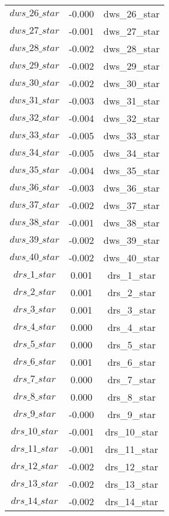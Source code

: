 \begin{center}
\begin{longtable}{ccc}
$dws\_26\_star$ 	 & 	 -0.000 	 & 	 dws\_26\_star\\
$dws\_27\_star$ 	 & 	 -0.001 	 & 	 dws\_27\_star\\
$dws\_28\_star$ 	 & 	 -0.002 	 & 	 dws\_28\_star\\
$dws\_29\_star$ 	 & 	 -0.002 	 & 	 dws\_29\_star\\
$dws\_30\_star$ 	 & 	 -0.002 	 & 	 dws\_30\_star\\
$dws\_31\_star$ 	 & 	 -0.003 	 & 	 dws\_31\_star\\
$dws\_32\_star$ 	 & 	 -0.004 	 & 	 dws\_32\_star\\
$dws\_33\_star$ 	 & 	 -0.005 	 & 	 dws\_33\_star\\
$dws\_34\_star$ 	 & 	 -0.005 	 & 	 dws\_34\_star\\
$dws\_35\_star$ 	 & 	 -0.004 	 & 	 dws\_35\_star\\
$dws\_36\_star$ 	 & 	 -0.003 	 & 	 dws\_36\_star\\
$dws\_37\_star$ 	 & 	 -0.002 	 & 	 dws\_37\_star\\
$dws\_38\_star$ 	 & 	 -0.001 	 & 	 dws\_38\_star\\
$dws\_39\_star$ 	 & 	 -0.002 	 & 	 dws\_39\_star\\
$dws\_40\_star$ 	 & 	 -0.002 	 & 	 dws\_40\_star\\
$drs\_1\_star$ 	 & 	 0.001 	 & 	 drs\_1\_star\\
$drs\_2\_star$ 	 & 	 0.001 	 & 	 drs\_2\_star\\
$drs\_3\_star$ 	 & 	 0.001 	 & 	 drs\_3\_star\\
$drs\_4\_star$ 	 & 	 0.000 	 & 	 drs\_4\_star\\
$drs\_5\_star$ 	 & 	 0.000 	 & 	 drs\_5\_star\\
$drs\_6\_star$ 	 & 	 0.001 	 & 	 drs\_6\_star\\
$drs\_7\_star$ 	 & 	 0.000 	 & 	 drs\_7\_star\\
$drs\_8\_star$ 	 & 	 0.000 	 & 	 drs\_8\_star\\
$drs\_9\_star$ 	 & 	 -0.000 	 & 	 drs\_9\_star\\
$drs\_10\_star$ 	 & 	 -0.001 	 & 	 drs\_10\_star\\
$drs\_11\_star$ 	 & 	 -0.001 	 & 	 drs\_11\_star\\
$drs\_12\_star$ 	 & 	 -0.002 	 & 	 drs\_12\_star\\
$drs\_13\_star$ 	 & 	 -0.002 	 & 	 drs\_13\_star\\
$drs\_14\_star$ 	 & 	 -0.002 	 & 	 drs\_14\_star\\

\end{longtable}
\end{center}
